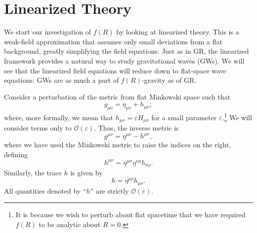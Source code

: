 \documentclass[aps,prd,amsfonts,amssymb,amsmath,nofootinbib,reprint,showpacs]{revtex4-1}
\newcommand{\order}[1]{\ensuremath{\mathcal{O}({#1})}}
\begin{document}
\section{Linearized Theory\label{sec:Lin}}

We start our investigation of $f(R)$ by looking at linearized theory. This is a weak-field approximation that assumes only small deviations from a flat background, greatly simplifying the field equations. Just as in GR, the linearized framework provides a natural way to study gravitational waves (GWs). We will see that the linearized field equations will reduce down to flat-space wave equations: GWs are as much a part of $f(R)$-gravity as of GR.

Consider a perturbation of the metric from flat Minkowski space such that
\begin{equation}
g_{\mu\nu} = \eta_{\mu\nu} + h_{\mu\nu};
\end{equation}
where, more formally, we mean that $h_{\mu\nu} = \varepsilon H_{\mu\nu}$ for a small parameter $\varepsilon$.\footnote{It is because we wish to perturb about flat spacetime that we have required $f(R)$ to be analytic about $R = 0$.} We will consider terms only to $\order{\varepsilon}$. Thus, the inverse metric is
\begin{equation}
g^{\mu\nu} = \eta^{\mu\nu} - h^{\mu\nu},
\end{equation}
where we have used the Minkowski metric to raise the indices on the right, defining
\begin{equation}
h^{\mu\nu} = \eta^{\mu\sigma}\eta^{\nu\rho}h_{\sigma\rho}.
\end{equation}
Similarly, the trace $h$ is given by
\begin{equation}
h = \eta^{\mu\nu}h_{\mu\nu}.
\end{equation}
All quantities denoted by ``$h$'' are strictly $\order{\varepsilon}$.
\end{document}
